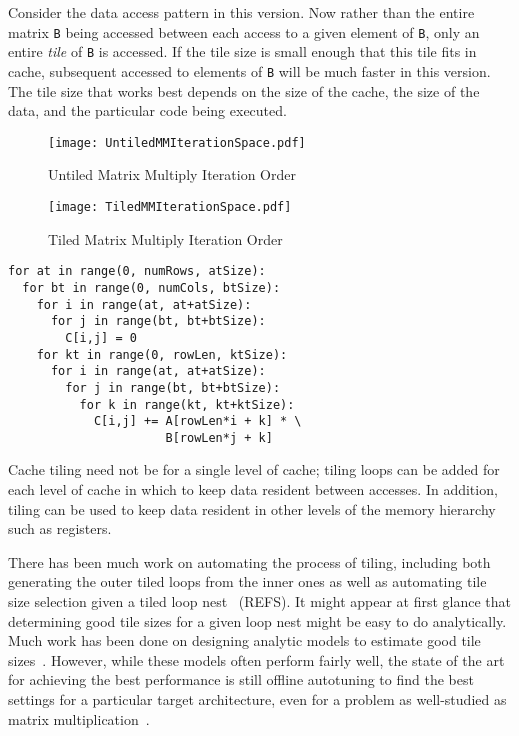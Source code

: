 Consider the data access pattern in this version.  Now rather than the entire matrix \lstinline{B} being accessed between each access to a given element of \lstinline{B}, only an entire \emph{tile} of \lstinline{B} is accessed.  If the tile size is small enough that this tile fits in cache, subsequent accessed to elements of \lstinline{B} will be much faster in this version.  The tile size that works best depends on the size of the cache, the size of the data, and the particular code being executed.

\begin{figure}
\centering
\texttt{[image: UntiledMMIterationSpace.pdf]}
\caption{Untiled Matrix Multiply Iteration Order}
\label{untiled_diagram}
\end{figure}

\begin{figure}
\centering
\texttt{[image: TiledMMIterationSpace.pdf]}
\caption{Tiled Matrix Multiply Iteration Order}
\label{tiled_diagram}
\end{figure}

\begin{lstlisting}[frame=single, label=tiledmm, caption={Tiled Matrix Multiply}, belowskip=0.5em]
for at in range(0, numRows, atSize):
  for bt in range(0, numCols, btSize):
    for i in range(at, at+atSize):
      for j in range(bt, bt+btSize):
        C[i,j] = 0
    for kt in range(0, rowLen, ktSize):
      for i in range(at, at+atSize):
        for j in range(bt, bt+btSize):
          for k in range(kt, kt+ktSize):
            C[i,j] += A[rowLen*i + k] * \
                      B[rowLen*j + k]
\end{lstlisting}

Cache tiling need not be for a single level of cache; tiling loops can be added for each level of cache in which to keep data resident between accesses.  In addition, tiling can be used to keep data resident in other levels of the memory hierarchy such as registers.

There has been much work on automating the process of tiling, including both generating the outer tiled loops from the inner ones as well as automating tile size selection given a tiled loop nest~\cite{Lam91, Wolf91} (REFS).  It might appear at first glance that determining good tile sizes for a given loop nest might be easy to do analytically.  Much work has been done on designing analytic models to estimate good tile sizes~\cite{Cole95, Shir12, Yoto03, Yoto05}.  However, while these models often perform fairly well, the state of the art for achieving the best performance is still offline autotuning to find the best settings for a particular target architecture, even for a problem as well-studied as matrix multiplication~\cite{Whal00}.

